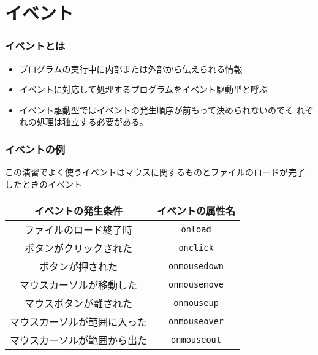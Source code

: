 

\frame{\maketitle}
 \section{イベント}
\begin{frame}[containsverbatim]
 \frametitle{イベントとは}
 \begin{itemize}
  \item プログラムの実行中に内部または外部から伝えられる情報
  \item イベントに対応して処理するプログラムをイベント駆動型と呼ぶ
  \item イベント駆動型ではイベントの発生順序が前もって決められないのでそ
        れぞれの処理は独立する必要がある。
 \end{itemize}
\end{frame}
\newcommand{\Event}[1]{\texttt{#1}}
\begin{frame}[containsverbatim]
 \frametitle{イベントの例}
 この演習でよく使うイベントはマウスに関するものとファイルのロードが完了
 したときのイベント
\begin{center}
\begin{tabular}[t]{|c|c|}
 \hline
イベントの発生条件& イベントの属性名%
\\\hline
ファイルのロード終了時  &\Event{onload} \\ \hline
ボタンがクリックされた &\Event{onclick}  \\ \hline
ボタンが押された &\Event{onmousedown}  \\ \hline
マウスカーソルが移動した&\Event{onmousemove}  \\ \hline
マウスボタンが離された&  \Event{onmouseup} \\ \hline
マウスカーソルが範囲に入った&\Event{onmouseover}  \\ \hline
マウスカーソルが範囲から出た&\Event{onmouseout}  \\ \hline
\end{tabular} 
\end{center}
\end{frame}

